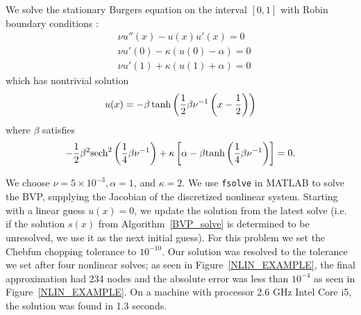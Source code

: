 We solve the stationary Burgers equation on the interval $[0,1]$ with Robin boundary conditions \cite{reyna1995exponentially}:
\begin{equation}
\begin{aligned}
&\nu u''(x)-u(x)u'(x)=0 \\
&\nu u'(0)-\kappa(u(0)-\alpha)=0 \\
&\nu u'(1)+\kappa(u(1)+\alpha)=0
\end{aligned}
\label{PUM_nlin_system}
\end{equation}
which has nontrivial solution
\begin{equation}
u(x)=-\beta \tanh \left( \frac{1}{2} \beta \nu^{-1} \left( x-\frac{1}{2} \right) \right)
\label{true_sol}
\end{equation}
where $\beta$ satisfies
\begin{equation}
-\frac{1}{2} \beta^2 \text{sech}^2 \left( \frac{1}{4} \beta \nu^{-1} \right)+\kappa \left [ \alpha-\beta \text{tanh} \left( \frac{1}{4} \beta \nu^{-1} \right) \right ]=0.
\end{equation}


We choose $\nu=5 \times 10^{-3},\alpha=1$, and $\kappa=2$. We use {\tt fsolve} in MATLAB to solve the BVP, supplying the Jacobian of the discretized nonlinear system. Starting with a linear guess $u(x)=0$, we update the solution from the latest solve (i.e. if the solution $s(x)$ from Algorithm~\ref{BVP_solve} is determined to be unresolved, we use it as the next initial guess). For this problem we set the Chebfun chopping tolerance to $10^{-10}$. Our solution was resolved to the tolerance we set after four nonlinear solves; as seen in Figure~\ref{NLIN_EXAMPLE}, the final approximation had 234 nodes and the absolute error was less than $10^{-4}$ as seen in Figure~\ref{NLIN_EXAMPLE}. On a machine with processor 2.6 GHz Intel Core i5, the solution was found in 1.3 seconds.

